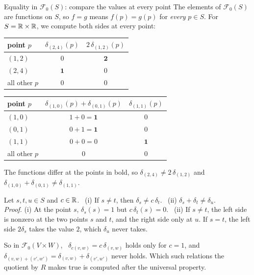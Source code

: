 \documentclass[aspectratio=1610,11pt]{beamer}
\begin{document}
\begin{frame}{Equality in $\mathcal{F}_0(S)$: compare the values at every point}
    \small
    The elements of $\mathcal{F}_0(S)$ are functions on $S$, so $f = g$ means $f(p) = g(p)$ for \emph{every} $p \in S$. For $S = \mathbb{R} \times \mathbb{R}$, we compute both sides at every point:
    \begin{center}
        \begin{tabular}{l|cc}
            point $p$ & $\delta_{(2, 4)}(p)$ & $2\,\delta_{(1, 2)}(p)$ \\ \hline
            $(1, 2)$ & $0$ & $\mathbf{2}$ \\
            $(2, 4)$ & $\mathbf{1}$ & $0$ \\
            all other $p$ & $0$ & $0$
        \end{tabular}
        \qquad
        \begin{tabular}{l|cc}
            point $p$ & $\delta_{(1, 0)}(p) + \delta_{(0, 1)}(p)$ & $\delta_{(1, 1)}(p)$ \\ \hline
            $(1, 0)$ & $1 + 0 = \mathbf{1}$ & $0$ \\
            $(0, 1)$ & $0 + 1 = \mathbf{1}$ & $0$ \\
            $(1, 1)$ & $0 + 0 = 0$ & $\mathbf{1}$ \\
            all other $p$ & $0$ & $0$
        \end{tabular}
    \end{center}
    The functions differ at the points in bold, so $\delta_{(2, 4)} \neq 2\,\delta_{(1, 2)}$ and $\delta_{(1, 0)} + \delta_{(0, 1)} \neq \delta_{(1, 1)}$.
    \begin{proposition}
        \small Let $s, t, u \in S$ and $c \in \mathbb{R}$. \ (i) If $s \neq t$, then $\delta_s \neq c\,\delta_t$. \ (ii) $\delta_s + \delta_t \neq \delta_u$.
        \\
        \emph{Proof.} (i) At the point $s$, $\delta_s(s) = 1$ but $c\,\delta_t(s) = 0$. \ (ii) If $s \neq t$, the left side is nonzero at the two points $s$ and $t$, and the right side only at $u$. If $s = t$, the left side $2\delta_s$ takes the value $2$, which $\delta_u$ never takes.
    \end{proposition}
    So in $\mathcal{F}_0(V \times W)$, \ $\delta_{c(v, w)} = c\,\delta_{(v, w)}$ holds only for $c = 1$, and $\delta_{(v, w) + (v', w')} = \delta_{(v, w)} + \delta_{(v', w')}$ never holds. Which such relations the quotient by $R$ makes true is computed after the universal property.
\end{frame}
\end{document}

